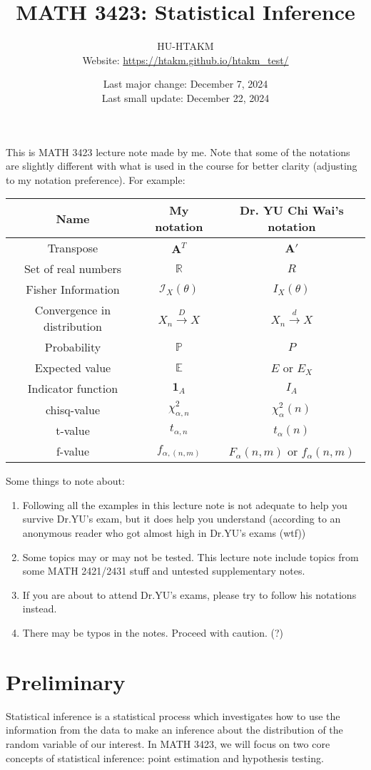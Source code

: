 \documentclass{huhtakm-template-book-v2}
\title{
	\Huge MATH 3423: Statistical Inference
}
\author{
	HU-HTAKM\\
	\small Website: \url{https://htakm.github.io/htakm_test/}
}
\date{
	Last major change: December 7, 2024\\
	Last small update: December 22, 2024
}
\DeclareMathOperator{\prob}{\mathbb{P}}
\DeclareMathOperator{\E}{\mathbb{E}}
\begin{document}
\maketitle
This is MATH 3423 lecture note made by me. Note that some of the notations are slightly different with what is used in the course for better clarity (adjusting to my notation preference). For example:
\begin{table}[h]
	\centering
	\begin{tabular}{||c|c|c||}
		\hline
		Name & My notation & Dr. YU Chi Wai's notation\\
		\hline
		Transpose & $\mathbf{A}^{T}$ &  $\mathbf{A}'$\\
		Set of real numbers & $\mathbb{R}$ & $R$\\
		Fisher Information & $\mathcal{I}_{X}(\theta)$ & $I_{X}(\theta)$\\
		Convergence in distribution & $X_{n}\xrightarrow{D}X$ & $X_{n}\xrightarrow{d}X$\\
		Probability & $\prob$ & $P$\\
		Expected value & $\E$ & $E$ or $E_{X}$\\
		Indicator function & $\mathbf{1}_{A}$ & $I_{A}$\\
		chisq-value & $\chi_{\alpha,n}^{2}$ & $\chi_{\alpha}^{2}(n)$\\
		t-value & $t_{\alpha,n}$ & $t_{\alpha}(n)$\\
		f-value & $f_{\alpha,(n,m)}$ & $F_{\alpha}(n,m)$ or $f_{\alpha}(n,m)$\\
		\hline
	\end{tabular}
\end{table}

Some things to note about:
\begin{enumerate}
	\item Following all the examples in this lecture note is not adequate to help you survive Dr.YU's exam, but it does help you understand (according to an anonymous reader who got almost high in Dr.YU's exams (wtf))
	\item Some topics may or may not be tested. This lecture note include topics from some MATH 2421/2431 stuff and untested supplementary notes.
	\item If you are about to attend Dr.YU's exams, please try to follow his notations instead.
	\item There may be typos in the notes. Proceed with caution. (?)
\end{enumerate}
\tableofcontents
\chapter{Preliminary}
Statistical inference is a statistical process which investigates how to use the information from the data to make an inference about the distribution of the random variable of our interest. In MATH 3423, we will focus on two core concepts of statistical inference: point estimation and hypothesis testing.
\end{document}
